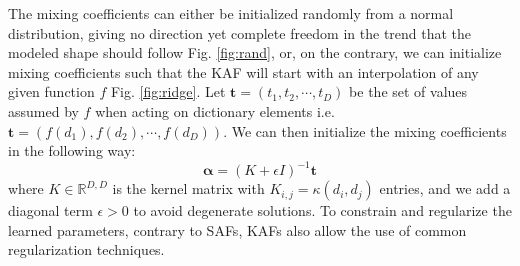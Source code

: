 \documentclass[LaM,binding=0.6cm]{./packages/sapthesis/sapthesis}
\begin{document}
    The mixing coefficients can either be initialized randomly from a normal distribution, giving no direction yet complete freedom in the trend that the modeled shape
    should follow Fig. \ref{fig:rand}, or, on the contrary, we can initialize mixing coefficients such that the KAF will start with an interpolation of any given function $f$
    Fig. \ref{fig:ridge}. Let $\mathbf{t} = (t_1, t_2, \cdots, t_D) $ be the set of values assumed by $f$ when acting on dictionary elements i.e. $\mathbf{t} = (f(d_1), f(d_2), \cdots, f(d_D)) $.
    We can then initialize the mixing coefficients in the following way:
    \begin{equation}
        \mathbf{\alpha} = \left(K  + \epsilon I \right)^{-1} \mathbf{t}
    \end{equation}
    where $K \in \mathbb{R}^{D,D}$ is the kernel matrix with $K_{i,j} = \kappa(d_i, d_j)$ entries, and we add a diagonal term $\epsilon > 0$ to avoid degenerate 
    solutions. To constrain and regularize the learned parameters, contrary to SAFs, KAFs also allow the use of common regularization techniques.
\end{document}
